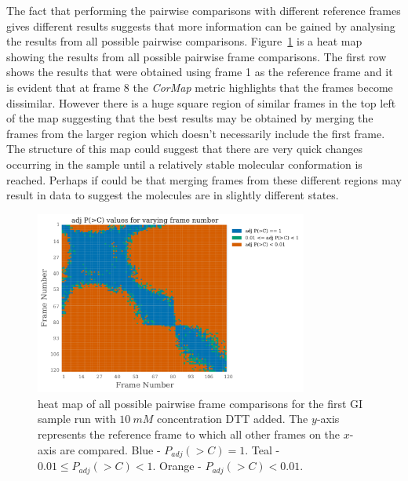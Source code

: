 The fact that performing the pairwise comparisons with different reference frames gives different results suggests that more information can be gained by analysing the results from all possible pairwise comparisons.
Figure~\ref{fig:heatmap - DTT} is a heat map showing the results from all possible pairwise frame comparisons.
The first row shows the results that were obtained using frame 1 as the reference frame and it is evident that at frame 8 the \textit{CorMap} metric highlights that the frames become dissimilar.
However there is a huge square region of similar frames in the top left of the map suggesting that the best results may be obtained by merging the frames from the larger region which doesn't necessarily include the first frame.
The structure of this map could suggest that there are very quick changes occurring in the sample until a relatively stable molecular conformation is reached.
Perhaps if could be that merging frames from these different regions may result in data to suggest the molecules are in slightly different states.
\begin{figure}
    \centering
    \includegraphics[width=0.8\textwidth]{figures/saxs/dtt_heatmap.pdf}
    \caption{heat map of all possible pairwise frame comparisons for the first GI sample run with $10\ mM$ concentration DTT added. The $y$-axis represents the reference frame to which all other frames on the $x$-axis are compared. Blue - $P_{adj}(>C) = 1$. Teal - $0.01 \le P_{adj}(>C) < 1 $. Orange - $P_{adj}(>C) < 0.01$.}
    \label{fig:heatmap - DTT}
\end{figure}

